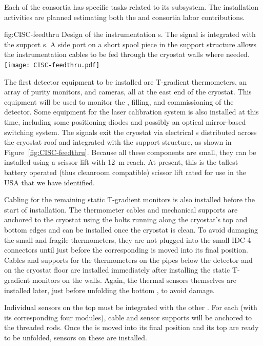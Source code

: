 Each of the   consortia has specific tasks related to its subsystem. 
The installation activities are planned estimating both the  and consortia labor contributions.

\begin{dunefigure}{fig:CISC-feedthru}
{Design of the instrumentation \fdth{}s. The signal \fdth is integrated with the  support \fdth{}s. A side port on a short spool piece in the  support structure allows the instrumentation cables to be fed through the cryostat walls where needed.}
\texttt{[image: CISC-feedthru.pdf]}
\end{dunefigure}

The first detector equipment to be installed are  T-gradient thermometers, an array of purity monitors, and cameras, all at the east end of the cryostat. This equipment will be used to monitor the \cooldown, filling, and commissioning of the detector. Some equipment for the laser calibration system is also installed at this time, including some positioning diodes and possibly an optical mirror-based switching system.  The signals exit the cryostat via electrical \fdth{}s distributed across the cryostat roof and integrated with the  support structure, as shown in Figure~\ref{fig:CISC-feedthru}. Because all these components are small, they can be installed using a scissor lift with \SI{12}{m} reach. At present, this is the tallest battery operated (thus cleanroom compatible) scissor lift rated for use in the USA that we have identified.



Cabling for the remaining static T-gradient monitors is also installed before the start of  installation.  The thermometer cables and mechanical supports are anchored to the cryostat using the bolts running along the cryostat's top and bottom edges and can be installed once the cryostat is clean. 
To avoid  damaging the small and fragile thermometers, they are not plugged into the small IDC-4 connectors until just before the corresponding  is moved into its final position. 
Cables and supports for the thermometers on the pipes below the detector and on the cryostat floor are installed immediately after installing the static T-gradient monitors on the walls.  
Again, the thermal sensors themselves are installed later, just before unfolding the bottom , to avoid damage.

Individual sensors on the top  must be integrated with the other . For each  (with its corresponding four  modules), cable and sensor supports will be anchored to the  threaded rods. Once the  is moved into its final position and its top  are ready to be unfolded, sensors on these  are installed.

